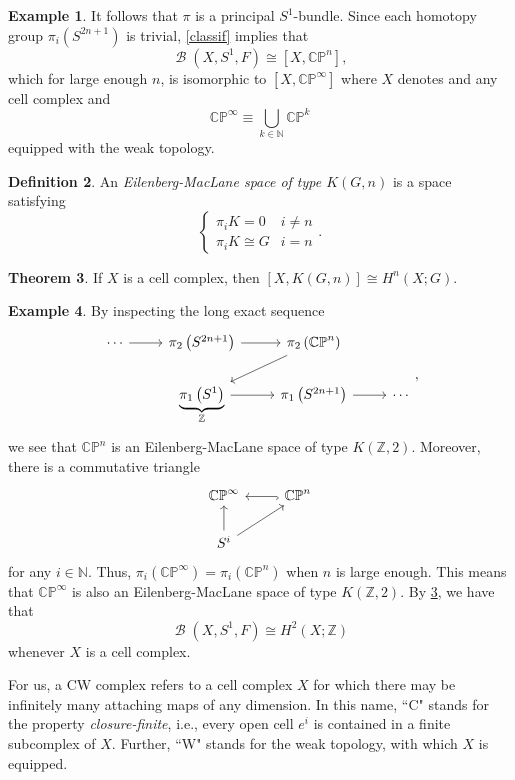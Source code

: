 \documentclass[10pt,letterpaper,cm]{nupset}
\theoremstyle{definition}
\newtheorem{defn}{Definition}[subsection]
\newtheorem{exmp}[defn]{Example}
\theoremstyle{theorem}
\newtheorem{theorem}[defn]{Theorem}
\theoremstyle{remark}
\newcommand{\CP}{\mathbb{CP}}
\newcommand{\N}{\mathbb N}
\newcommand{\Z}{\mathbb Z}
\newcommand{\1}{\mathbb{1}}
\newcommand{\0}{\vec 0}
\DeclareMathOperator{\B}{\mathcal{B}}
\begin{document}
\begin{exmp}
It follows that $\pi$ is a principal $S^1$-bundle. Since each homotopy group $\pi_i\left(S^{2n+1}\right)$ is trivial,  \cref{classif} implies that $$\B\left(X, S^1, F\right) \cong \left[X, \CP^n\right],$$ which for large enough $n$, is isomorphic to $\left[X, \CP^{\infty}\right]$ where $X$ denotes and any cell complex and $$\CP^{\infty} \equiv \bigcup_{k\in \N}\CP^k$$ equipped with the weak topology.
\end{exmp}

\begin{defn}
An \textit{Eilenberg-MacLane space of type $K\left(G, n\right)$} is a space satisfying 
\[
\begin{cases}
\pi_i{K} = 0 & i \ne n
\\ \pi_i{K} \cong G & i =n
\end{cases}.
\]
\end{defn}

\begin{theorem}\label{EM}
If $X$ is a cell complex, then $\left[X, K\left(G, n\right)\right] \cong H^n\left(X; G\right)$.
\end{theorem}

\begin{exmp}
By inspecting the long exact sequence
\[
\begin{tikzcd}
\cdots \arrow[r] & \pi_2\left(S^{2n+1}\right) \arrow[r]              & \pi_2\left(\CP^n\right) \arrow[ld]   &        \\
                 & \underbrace{\pi_1\left(S^1\right)}_{\Z} \arrow[r] & \pi_1\left(S^{2n+1}\right) \arrow[r] & \cdots
\end{tikzcd}
,\] we see that $\CP^n$ is an Eilenberg-MacLane space of type $K\left(\Z, 2\right)$. Moreover, there is a commutative triangle
\[
\begin{tikzcd}
\CP^{\infty}             & \CP^n \arrow[l, hook] \\
S^i \arrow[u] \arrow[ru] &                      
\end{tikzcd}
\] for any $i\in \N$. Thus, $\pi_i\left(\CP^{\infty}\right) = \pi_i\left(\CP^n\right)$ when $n$ is large enough. This means that $\CP^{\infty}$ is also 
an Eilenberg-MacLane space of type $K\left(\Z, 2\right)$. By \cref{EM}, we have that $$\B\left(X, S^1, F\right) \cong H^2\left(X; \Z\right)$$ whenever $X$ is a cell complex. 
\end{exmp}

For us, a CW complex refers to a cell complex $X$ for which there may be infinitely many attaching maps of any dimension. In this name, ``C" stands for the property \textit{closure-finite}, i.e., every open cell $e^i$ is contained in a finite subcomplex of $X$. Further, ``W" stands for the weak topology, with which $X$ is equipped.
\end{document}
